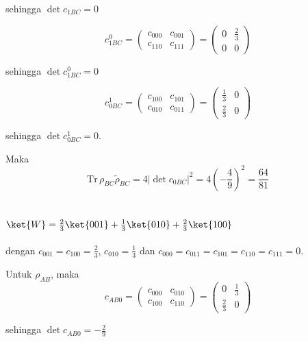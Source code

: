 sehingga $\det c_{1BC} = 0$

\begin{equation}
	c_{1BC}^0=
	\begin{pmatrix}
		c_{000} & c_{001} \\
		c_{110} & c_{111}
	\end{pmatrix}=
	\begin{pmatrix}
		0 & \frac{2}{3} \\
		0 & 0
	\end{pmatrix}
\end{equation}

sehingga $\det c_{1BC}^0 = 0$

\begin{equation}
	c_{0BC}^1=
	\begin{pmatrix}
		c_{100} & c_{101} \\
		c_{010} & c_{011}
	\end{pmatrix}=
	\begin{pmatrix}
		\frac{1}{3} & 0 \\
		\frac{2}{3} & 0
	\end{pmatrix}
\end{equation}

sehingga $\det c_{0BC}^1 = 0$.

Maka
\begin{equation}
	\mathrm{Tr}\,\rho_{BC}\tilde{\rho}_{BC}=4|\det c_{0BC}|^2=4(-\frac{4}{9})^2=\frac{64}{81}
\end{equation}

\subsection{ $\ket{W}=\frac{2}{3}\ket{001}+\frac{1}{3}\ket{010}+\frac{2}{3}\ket{100}$}
dengan $c_{001}=c_{100}=\frac{2}{3}$, $c_{010}=\frac{1}{3}$ dan $c_{000}=c_{011}=c_{101}=c_{110}=c_{111}=0$.

Untuk $\rho_{AB}$, maka
\begin{equation}
	c_{AB0}=
	\begin{pmatrix}
		c_{000} & c_{010} \\
		c_{100} & c_{110}
	\end{pmatrix}=
	\begin{pmatrix}
		0 & \frac{1}{3} \\
		\frac{2}{3} & 0
	\end{pmatrix}
\end{equation}

sehingga $\det c_{AB0} = -\frac{2}{9}$

